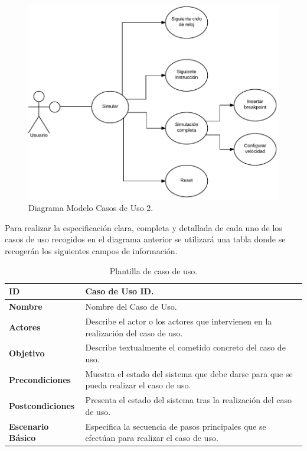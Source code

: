 \begin{figure}[htbp]
 	\centering
 	\includegraphics[width=15cm]{figures/user_cases_2}
 	\caption{Diagrama Modelo Casos de Uso 2.}
	\label{fig:user_cases2}
\end{figure}

Para realizar la especificación clara, completa y detallada de cada uno de los casos de uso recogidos en el diagrama anterior se utilizará una tabla donde se recogerán los siguientes campos de información.

\begin{center}
\begin{table}[htbp]
\centering
\begin{tabular}{@{}p{2.5cm} p{9cm}@{}} 
\toprule
\textbf{ID}	& Caso de Uso ID.  \\
\midrule
\textbf{Nombre} 		& Nombre del Caso de Uso.   \\
\midrule
\textbf{Actores} 		&	Describe el actor o los actores que intervienen en la realización del caso de uso.  \\
\midrule
\textbf{Objetivo} 	&	Describe textualmente el cometido concreto del caso de uso. 	 \\
\midrule
\textbf{Precondiciones}	&	Muestra el estado del sistema que debe darse para que se pueda realizar el caso de uso.   \\
\midrule
\textbf{Postcondiciones} 	&	Presenta el estado del sistema tras la realización del caso de uso.   \\
\midrule
\textbf{Escenario Básico} 	&  Especifica la secuencia de pasos principales que se efectúan para realizar el caso de uso. \\
\bottomrule
\end{tabular}
\caption{Plantilla de caso de uso.}
\label{tab:uc_template}
\end{table}
\end{center}

